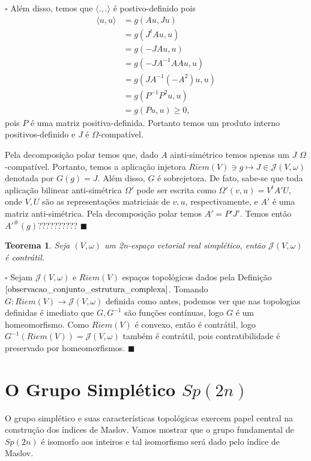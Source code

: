 \documentclass[12pt]{book}
\newtheorem{teorema}{Teorema}[section]
\newenvironment{prova}[1]{$\square$ #1}{\hfill$\blacksquare$}
\newcommand{\estruturascomplexaspadrao}{\mathcal{J}(V, \omega)}
\newcommand{\gruposimpletico}[1]{Sp(#1)}
\newcommand{\produtointerno}[2]{\langle #1, #2 \rangle}
\newcommand{\produtointernoabrev}{\langle ., .\rangle}
\newcommand{\produtosinternos}[1]{Riem(#1)}
\newcommand{\vermelho}[1]{{\color{red}#1}}
\begin{document}
\begin{prova}
		Além disso, temos que $\produtointernoabrev$ é postivo-definido pois
		$$
		\begin{aligned}
		\produtointerno{u}{u} &= g(Au, Ju)
		\\
		&= g(J^{t}Au, u)
		\\
		&=g(-JAu, u)
		\\
		&=g(-JA^{-1}AAu, u)
		\\
		&=g(JA^{-1}(-A^{2})u, u)
		\\
		&=g(P^{-1}P^{2}u, u)
		\\
		&=g(Pu, u)\geq 0,
		\end{aligned}
		$$ 
		pois $P$ é uma matriz positiva-definida. Portanto temos um produto interno positivos-definido e $J$ é $\Omega$-compatível. 
		
		Pela decomposição polar temos que, dado $A$ ainti-simétrico temos apenas um $J$ $\Omega$-compatível. Portanto, temos a aplicação injetora $\produtosinternos{V} \ni g \mapsto J \in \estruturascomplexaspadrao$ denotada por $G(g) = J$. Além disso, $G$ é sobrejetora. De fato, sabe-se que toda aplicação bilinear anti-simétrica $\Omega'$ pode ser escrita como $\Omega'(v, u) = V^{t}A'U$, onde $V,U$ são as representações matriciais de $v,u$, respectivamente, e $A'$ é uma matriz anti-simétrica. Pela decomposição polar temos $A'=P'J'$. \vermelho{Temos então $A'^{\#}(g)$??????????}
	\end{prova}		
	
	\begin{teorema}
		Seja $(V,\omega)$ um 2n-espaço vetorial real simplético, então $\estruturascomplexaspadrao$ é contrátil.
	\end{teorema}
	\begin{prova}
		Sejam $\estruturascomplexaspadrao$ e $\produtosinternos{V}$ espaços topológicos dados pela Definição $\ref{observacao_conjunto_estrutura_complexa}$. Tomando $G:\produtosinternos{V} \to \estruturascomplexaspadrao$ definida como antes, \vermelho{podemos ver que nas topologias definidas é imediato que $G, G^{-1}$ são funções contínuas}, logo $G$ é um homeomorfismo. Como $\produtosinternos{V}$ é convexo, então é contrátil, logo $G^{-1}(\produtosinternos{V}) = \estruturascomplexaspadrao$ também é contrátil, pois contratibilidade é preservado por homeomorfismos.
	\end{prova}			
	
	\chapter{O Grupo Simplético $\gruposimpletico{2n}$}
	O grupo simplético e suas características topológicas exercem papel central na construção dos índices de Maslov. Vamos mostrar que o grupo fundamental de $Sp(2n)$ é isomorfo aos inteiros e tal isomorfismo será dado pelo índice de Maslov.
	
\end{document}
